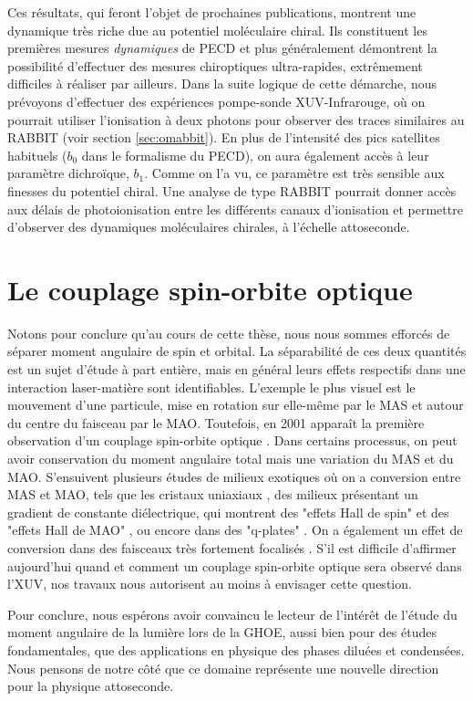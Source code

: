 Ces résultats, qui feront l'objet de prochaines publications, montrent une dynamique très riche due au potentiel moléculaire chiral. Ils constituent les premières mesures \textit{dynamiques} de PECD et plus généralement démontrent la possibilité d'effectuer des mesures chiroptiques ultra-rapides, extrêmement difficiles à réaliser par ailleurs. Dans la suite logique de cette démarche, nous prévoyons d'effectuer des expériences pompe-sonde XUV-Infrarouge, où on pourrait utiliser l'ionisation à deux photons pour observer des traces similaires au RABBIT (voir section \ref{sec:omabbit}). En plus de l'intensité des pics satellites habituels ($b_0$ dans le formalisme du PECD), on aura également accès à leur paramètre dichroïque, $b_1$. Comme on l'a vu, ce paramètre est très sensible aux finesses du potentiel chiral. Une analyse de type RABBIT pourrait donner accès aux délais de photoionisation entre les différents canaux d'ionisation et permettre d'observer des dynamiques moléculaires chirales, à l'échelle attoseconde. 

\section{Le couplage spin-orbite optique}
Notons pour conclure qu'au cours de cette thèse, nous nous sommes efforcés de séparer moment angulaire de spin et orbital. La séparabilité de ces deux quantités est un sujet d'étude à part entière, mais en général leurs effets respectifs dans une interaction laser-matière sont identifiables. L'exemple le plus visuel est le mouvement d'une particule, mise en rotation sur elle-même par le MAS et autour du centre du faisceau par le MAO. Toutefois, en 2001 apparaît la première observation d'un couplage spin-orbite optique . Dans certains processus, on peut avoir conservation du moment angulaire total mais une variation du MAS et du MAO. S'ensuivent plusieurs études de milieux exotiques où on a conversion entre MAS et MAO, tels que les cristaux uniaxiaux , des milieux présentant un gradient de constante diélectrique, qui montrent des "effets Hall de spin"  et des "effets Hall de MAO" , ou encore dans des "q-plates" . On a également un effet de conversion dans des faisceaux très fortement focalisés . S'il est difficile d'affirmer aujourd'hui quand et comment un couplage spin-orbite optique sera observé dans l'XUV, nos travaux nous autorisent au moins à envisager cette question. 

Pour conclure, nous espérons avoir convaincu le lecteur de l'intérêt de l'étude du moment angulaire de la lumière lors de la GHOE, aussi bien pour des études fondamentales, que des applications en physique des phases diluées et condensées. Nous pensons de notre côté que ce domaine représente une nouvelle direction pour la physique attoseconde.
